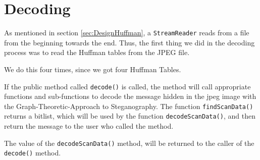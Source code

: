 \section{Decoding}
As mentioned in section \ref{sec:DesignHuffman}, a \lstinline|StreamReader| reads from a file from the beginning towards the end.
Thus, the first thing we did in the decoding process was to read the Huffman tables from the JPEG file. 

We do this four times, since we got four Huffman Tables.

If the public method called \lstinline|decode()| is called, the method will call appropriate functions and sub-functions to decode the message hidden in the jpeg image with the Graph-Theoretic-Approach to Steganography.
The function \lstinline|findScanData()| returns a bitlist, which will be used by the function \lstinline|decodeScanData()|, and then return the message to the user who called the method.


The value of the \lstinline|decodeScanData()| method, will be returned to the caller of the \lstinline|decode()| method.
